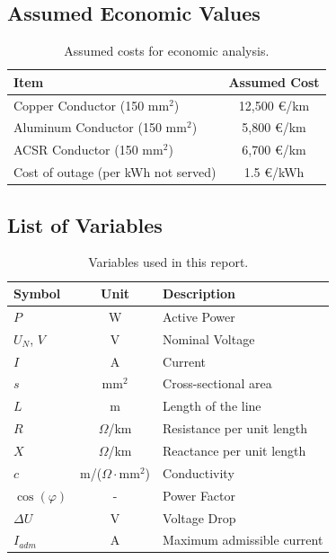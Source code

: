 \documentclass[12pt, a4paper]{article}
\begin{document}
\subsection{Assumed Economic Values}
\begin{table}[htbp]
    \centering
    \caption{Assumed costs for economic analysis.}
    \label{tab:economic_values}
    \begin{tabular}{@{}lc@{}}
        \toprule
        \textbf{Item} & \textbf{Assumed Cost} \\ \midrule
        Copper Conductor (150 $\text{mm}^2$) & 12,500 €/km \\
        Aluminum Conductor (150 $\text{mm}^2$) & 5,800 €/km \\
        ACSR Conductor (150 $\text{mm}^2$) & 6,700 €/km \\
        Cost of outage (per kWh not served) & 1.5 €/kWh \\
        \bottomrule
    \end{tabular}
\end{table}

\subsection{List of Variables}
\begin{table}[htbp]
    \centering
    \caption{Variables used in this report.}
    \label{tab:variables}
    \begin{tabular}{@{}lcl@{}}
        \toprule
        \textbf{Symbol} & \textbf{Unit} & \textbf{Description} \\ \midrule
        $P$ & W & Active Power \\
        $U_N$, $V$ & V & Nominal Voltage \\
        $I$ & A & Current \\
        $s$ & $\text{mm}^2$ & Cross-sectional area \\
        $L$ & m & Length of the line \\
        $R$ & $\Omega$/km & Resistance per unit length \\
        $X$ & $\Omega$/km & Reactance per unit length \\
        $c$ & m/($\Omega \cdot \text{mm}^2$) & Conductivity \\
        $\cos(\varphi)$ & - & Power Factor \\
        $\Delta U$ & V & Voltage Drop \\
        $I_{adm}$ & A & Maximum admissible current \\
        \bottomrule
    \end{tabular}
\end{table}
\end{document}
